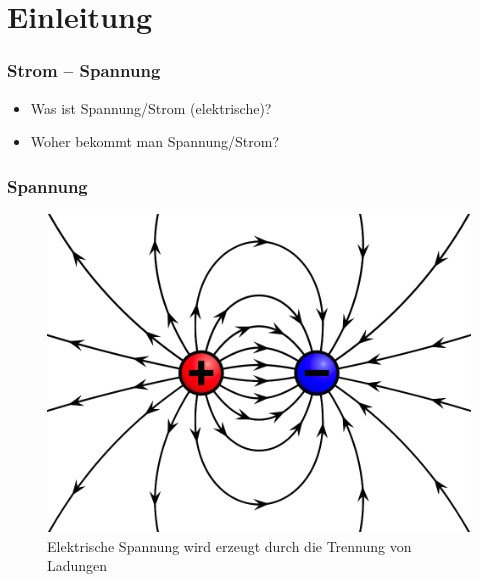 

\subtitle{Technik 02: \\
          Spannung und Strom, Wechselspannung \\[2em]}
\date{Stand 18.09.2017}


\section*{Einleitung}

\begin{frame}
  \frametitle{Strom -- Spannung}
  \begin{itemize}
    \item Was ist Spannung/Strom (elektrische)?
    \item Woher bekommt man Spannung/Strom?
  \end{itemize}
\end{frame}

\begin{frame}
  \frametitle{Spannung}
  \begin{center}
    \begin{figure}
      \includegraphics[width=.6\textwidth,height=.75\textheight,keepaspectratio]{e02/ladung.png}
      \caption{Elektrische Spannung wird erzeugt durch die Trennung von Ladungen \cite{charge}}
      \label{fig_charge}
    \end{figure}
  \end{center}
\end{frame}


